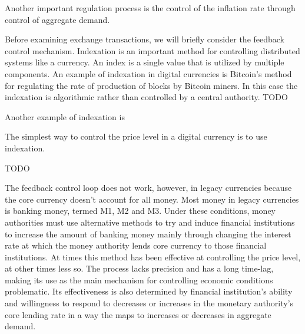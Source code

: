 Another important regulation process is the control of the inflation rate through control of
aggregate demand.

Before examining exchange transactions, we will briefly consider the feedback control mechanism.
Indexation is an important method for controlling distributed systems like a currency. An index is a
single value that is utilized by multiple components. An example of indexation in digital currencies
is Bitcoin's method for regulating the rate of production of blocks by Bitcoin miners. In this case
the indexation is algorithmic rather than controlled by a central authority. TODO

Another example of indexation is 

The simplest way to control the price level in a digital currency is to use indexation.





TODO

The feedback control loop does not work, however, in legacy currencies because the core currency
doesn't account for all money. Most money in legacy currencies is banking money, termed M1, M2 and
M3. Under these conditions, money authorities must use alternative methods to try and induce
financial institutions to increase the amount of banking money mainly through changing the interest
rate at which the money authority lends core currency to those financial institutions. At times this
method has been effective at controlling the price level, at other times less so. The process lacks
precision and has a long time-lag, making its use as the main mechanism for controlling economic
conditions problematic. Its effectiveness is also determined by financial institution's ability and
willingness to respond to decreases or increases in the monetary authority's core lending rate in a
way the maps to increases or decreases in aggregate demand.

